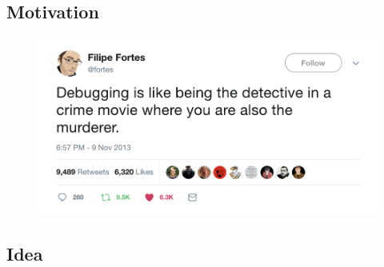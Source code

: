 \subsection{Motivation}
\begin{frame}{\phantom{title}}
	\begin{center}

		\begin{figure}
			\includegraphics[width= \textwidth]{../figures/tweet-quote.png}
		\end{figure}

	\end{center}
\end{frame}


\subsection{Idea}

